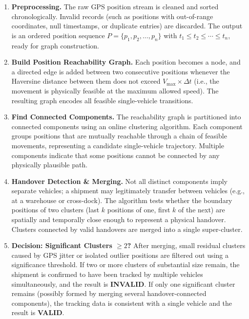 \begin{enumerate}
    \item \textbf{Preprocessing.} The raw GPS position stream is cleaned and sorted chronologically. Invalid records (such as positions with out-of-range coordinates, null timestamps, or duplicate entries) are discarded. The output is an ordered position sequence $P = \{p_1, p_2, \ldots, p_n\}$ with $t_1 \leq t_2 \leq \cdots \leq t_n$, ready for graph construction.

    \item \textbf{Build Position Reachability Graph.} Each position becomes a node, and a directed edge is added between two consecutive positions whenever the Haversine distance between them does not exceed $V_{\max} \times \Delta t$ (i.e., the movement is physically feasible at the maximum allowed speed). The resulting graph encodes all feasible single-vehicle transitions.

    \item \textbf{Find Connected Components.} The reachability graph is partitioned into connected components using an online clustering algorithm. Each component groups positions that are mutually reachable through a chain of feasible movements, representing a candidate single-vehicle trajectory. Multiple components indicate that some positions cannot be connected by any physically plausible path.

    \item \textbf{Handover Detection \& Merging.} Not all distinct components imply separate vehicles; a shipment may legitimately transfer between vehicles (e.g., at a warehouse or cross-dock). The algorithm tests whether the boundary positions of two clusters (last $k$ positions of one, first $k$ of the next) are spatially and temporally close enough to represent a physical handover. Clusters connected by valid handovers are merged into a single super-cluster.

    \item \textbf{Decision: Significant Clusters $\geq 2$?} After merging, small residual clusters caused by GPS jitter or isolated outlier positions are filtered out using a significance threshold. If two or more clusters of substantial size remain, the shipment is confirmed to have been tracked by multiple vehicles simultaneously, and the result is \textbf{INVALID}. If only one significant cluster remains (possibly formed by merging several handover-connected components), the tracking data is consistent with a single vehicle and the result is \textbf{VALID}.
\end{enumerate}
